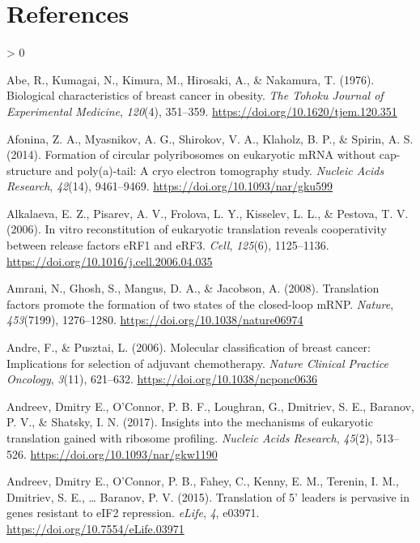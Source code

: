 \documentclass[
  12pt,
  openany]{book}
\newlength{\cslhangindent}
\newenvironment{CSLReferences}[2] %
 {%
  \setlength{\parindent}{0pt}
  \ifodd #1 \everypar{\setlength{\hangindent}{\cslhangindent}}\ignorespaces\fi
  \ifnum #2 > 0
  \setlength{\parskip}{#2\baselineskip}
  \fi
 }%
 {}
\begin{document}
\hypertarget{references}{%
\chapter*{References}\label{references}}

\hypertarget{refs}{}
\begin{CSLReferences}{1}{0}
\leavevmode\hypertarget{ref-Abe1976}{}%
Abe, R., Kumagai, N., Kimura, M., Hirosaki, A., \& Nakamura, T. (1976). Biological characteristics of breast cancer in obesity. \emph{The Tohoku Journal of Experimental Medicine}, \emph{120}(4), 351--359. \url{https://doi.org/10.1620/tjem.120.351}

\leavevmode\hypertarget{ref-Afonina2014}{}%
Afonina, Z. A., Myasnikov, A. G., Shirokov, V. A., Klaholz, B. P., \& Spirin, A. S. (2014). Formation of circular polyribosomes on eukaryotic {mRNA} without cap-structure and poly(a)-tail: A cryo electron tomography study. \emph{Nucleic Acids Research}, \emph{42}(14), 9461--9469. \url{https://doi.org/10.1093/nar/gku599}

\leavevmode\hypertarget{ref-Alkalaeva2006}{}%
Alkalaeva, E. Z., Pisarev, A. V., Frolova, L. Y., Kisselev, L. L., \& Pestova, T. V. (2006). In vitro reconstitution of eukaryotic translation reveals cooperativity between release factors {eRF}1 and {eRF}3. \emph{Cell}, \emph{125}(6), 1125--1136. \url{https://doi.org/10.1016/j.cell.2006.04.035}

\leavevmode\hypertarget{ref-Amrani2008}{}%
Amrani, N., Ghosh, S., Mangus, D. A., \& Jacobson, A. (2008). Translation factors promote the formation of two states of the closed-loop {mRNP}. \emph{Nature}, \emph{453}(7199), 1276--1280. \url{https://doi.org/10.1038/nature06974}

\leavevmode\hypertarget{ref-Andre2006}{}%
Andre, F., \& Pusztai, L. (2006). Molecular classification of breast cancer: Implications for selection of adjuvant chemotherapy. \emph{Nature Clinical Practice Oncology}, \emph{3}(11), 621--632. \url{https://doi.org/10.1038/ncponc0636}

\leavevmode\hypertarget{ref-Andreev2017}{}%
Andreev, Dmitry E., O'Connor, P. B. F., Loughran, G., Dmitriev, S. E., Baranov, P. V., \& Shatsky, I. N. (2017). Insights into the mechanisms of eukaryotic translation gained with ribosome profiling. \emph{Nucleic Acids Research}, \emph{45}(2), 513--526. \url{https://doi.org/10.1093/nar/gkw1190}

\leavevmode\hypertarget{ref-Andreev2015}{}%
Andreev, Dmitry E., O'Connor, P. B., Fahey, C., Kenny, E. M., Terenin, I. M., Dmitriev, S. E., \ldots{} Baranov, P. V. (2015). Translation of 5' leaders is pervasive in genes resistant to {eIF}2 repression. \emph{{eLife}}, \emph{4}, e03971. \url{https://doi.org/10.7554/eLife.03971}


\end{CSLReferences}
\end{document}
